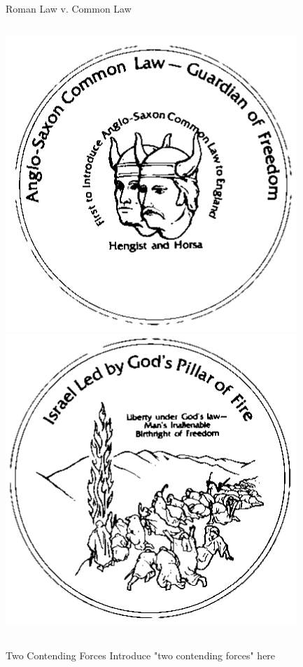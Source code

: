 \begin{frame}{Roman Law v. Common Law}
\begin{columns}[onlytextwidth]
            \centering
            \includegraphics[height=0.35\textheight]{img/hh-coin.png} \\
            \includegraphics[height=0.35\textheight]{img/israel-coin.png} \\
    \end{columns}
\end{frame}

\begin{frame}{Two Contending Forces}
    Introduce "two contending forces" here
\end{frame}

